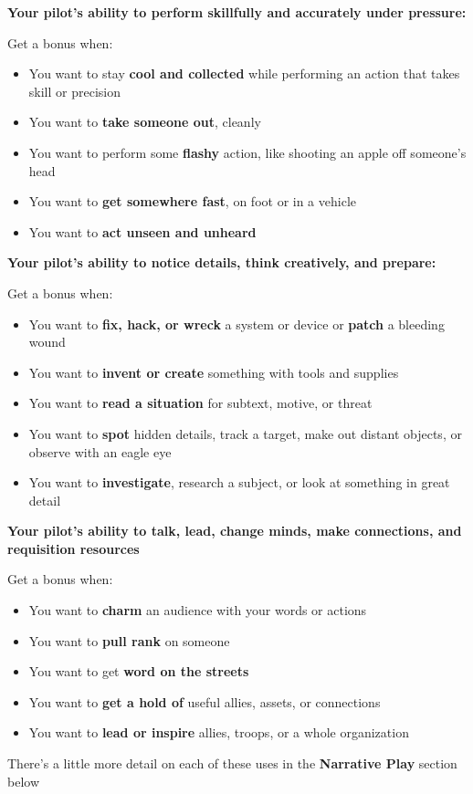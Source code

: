 \textbf{Your pilot's ability to perform skillfully and accurately under pressure:}

Get a bonus when:
\begin{itemize}
\item You want to stay \textbf{cool and collected} while performing an action that takes skill or precision
\item You want to \textbf{take someone out}, cleanly
\item You want to perform some \textbf{flashy} action, like shooting an apple off someone's head
\item You want to \textbf{get somewhere fast}, on foot or in a vehicle
\item You want to \textbf{act unseen and unheard}
\end{itemize}  

\textbf{Your pilot's ability to notice details, think creatively, and prepare:}

Get a bonus when:
\begin{itemize}
\item You want to \textbf{fix, hack, or wreck} a system or device or \textbf{patch} a bleeding wound
\item You want to \textbf{invent or create} something with tools and supplies
\item You want to \textbf{read a situation} for subtext, motive, or threat
\item You want to \textbf{spot} hidden details, track a target, make out distant objects, or observe with an eagle eye
\item You want to \textbf{investigate}, research a subject, or look at something in great detail
\end{itemize}  

\textbf{Your pilot's ability to talk, lead, change minds, make connections, and requisition resources}

Get a bonus when:
\begin{itemize}
\item You want to \textbf{charm} an audience with your words or actions
\item You want to \textbf{pull rank} on someone
\item You want to get \textbf{word on the streets}
\item You want to \textbf{get a hold of} useful allies, assets, or connections
\item You want to \textbf{lead or inspire} allies, troops, or a whole organization
\end{itemize}  

There's a little more detail on each of these uses in the \textbf{Narrative Play} section below